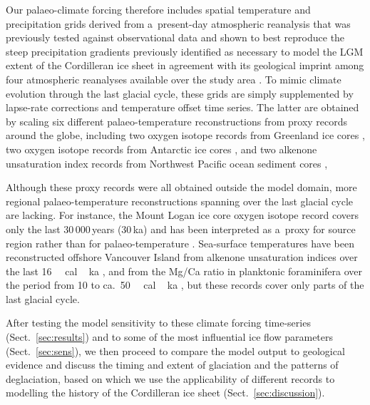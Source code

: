 \documentclass[tc, manuscript]{copernicus}
\begin{document}
      Our palaeo-climate forcing therefore includes spatial temperature and
      precipitation grids derived from a~present-day atmospheric reanalysis
      \citep{Mesinger.etal.2006} that was previously tested against
      observational data and shown to best reproduce the steep precipitation
      gradients previously identified as necessary to model the LGM extent
      of the Cordilleran ice sheet in agreement with its geological imprint
      among four atmospheric reanalyses available over the study area
      \citep{Seguinot.etal.2014}. To mimic climate evolution through the
      last glacial cycle, these grids are simply supplemented by lapse-rate
      corrections and temperature offset time series. The latter are
      obtained by scaling six different palaeo-temperature reconstructions
      from proxy records around the globe, including two oxygen isotope
      records from Greenland ice cores \citep{Dansgaard.etal.1993,
      Andersen.etal.2004}, two oxygen isotope records from Antarctic ice
      cores \citep{Petit.etal.1999,Jouzel.etal.2007}, and two alkenone
      unsaturation index records from Northwest Pacific ocean sediment cores
      \citep{Herbert.etal.2001},

      Although these proxy records were all obtained outside the model
      domain, more regional palaeo-temperature reconstructions spanning over
      the last glacial cycle are lacking. For instance, the Mount Logan ice
      core oxygen isotope record covers only the last 30\,000\,\unit{years}
      (30\,\unit{ka}) and has been interpreted as a~proxy for source region
      rather than for palaeo-temperature \citep{Fisher.etal.2004,
      Fisher.etal.2008}. Sea-surface temperatures have been reconstructed
      offshore Vancouver Island from alkenone unsaturation indices over the
      last 16\,\unit{\,cal\,ka} \citep{Kienast.McKay.2001}, and
      from the Mg/Ca ratio in planktonic foraminifera over the period from
      10 to ca.~50\,\unit{\,cal\,ka} \citep{Taylor.etal.2014,
      Taylor.etal.2015}, but these records cover only parts of the last
      glacial cycle.

      After testing the model sensitivity to
      these climate forcing time-series (Sect.~\ref{sec:results}) and to
      some of the most influential ice flow parameters
      (Sect.~\ref{sec:sens}), we then proceed to compare the model output
      to geological evidence and discuss the timing and extent of glaciation
      and the patterns of deglaciation, based on which we use the
      applicability of different records to modelling the history of the
      Cordilleran ice sheet (Sect.~\ref{sec:discussion}).
\end{document}
